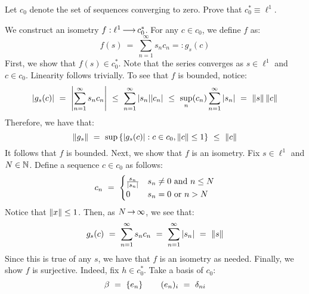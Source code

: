 \begin{qu}[num=22]
    Let $ c_{0} $ denote the set of sequences converging to zero.
    Prove that $ c_{0}^{*} \equiv \ell^{1} $.
\end{qu}

\begin{soln}
    We construct an isometry $ f:\ell^{1}\operatorname{\longrightarrow} c_{0}^{*} $.
    For any $ c \in c_{0} $, we define $ f $ as:
    \begin{equation*}
        f(s) \ = \ \sum_{n=1}^{\infty}s_{n}c_{n} =: g_{s}(c)
    \end{equation*}
    First, we show that $ f(s) \in c_{0}^{*} $. Note that the series converges
    as $ s \in \ell^{1} $ and $ c \in c_{0} $. Linearity follows trivially.
    To see that $ f $ is bounded, notice:
    \begin{equation*}
        \abs{g_{s}(c)} \ = \ \abs{\sum_{n=1}^{\infty}s_{n}c_{n}} \ \leq \
        \sum_{n=1}^{\infty}\abs{s_{n}}\abs{c_{n}} \ \leq \ \sup_{n}(c_{n})
        \sum_{n=1}^{\infty}\abs{s_{n}} \ = \ \norm{s}\norm{c}
    \end{equation*}
    Therefore, we have that:
    \begin{equation*}
        \norm{g_{s}} \ = \ \sup\set{\abs{g_{s}(c)}:c\in c_{0},\norm{c}\leq1}
        \ \leq \ \norm{c}
    \end{equation*}
    It follows that $ f $ is bounded. Next, we show that $ f $ is an isometry.
    Fix $ s \in \ell^{1} $ and $ N \in \mathbb{N} $. Define a sequence $ c \in c_{0} $
    as follows:
    \begin{equation*}
        c_{n} \ = \
        \begin{cases}
            \frac{s_{n}}{\abs{s_{n}}} & s_{n}\neq0 \textrm{ and } n \leq N \\
            0 & s_{n}=0 \textrm{ or } n > N
        \end{cases}
    \end{equation*}
    Notice that $ \left\|x\right\| \leq 1 $. Then, as $ N \operatorname{\rightarrow} \infty $, we see that:
    \begin{equation*}
        g_{s}(c) \ = \ \sum_{n=1}^{\infty}s_{n}c_{n} \ = \ \sum_{n=1}^{\infty}
        \abs{s_{n}} \ = \ \left\|s\right\|
    \end{equation*}
    Since this is true of any $ s $, we have that $ f $ is an isometry as
    needed. Finally, we show $ f $ is surjective. Indeed, fix $ h \in
    c_{0}^{*} $. Take a basis of $ c_{0} $:
    \begin{equation*}
        \beta \ = \ \set{e_{n}} \qquad
        (e_{n})_{i} \ = \ \delta_{ni}

\end{equation*}
\end{soln}
